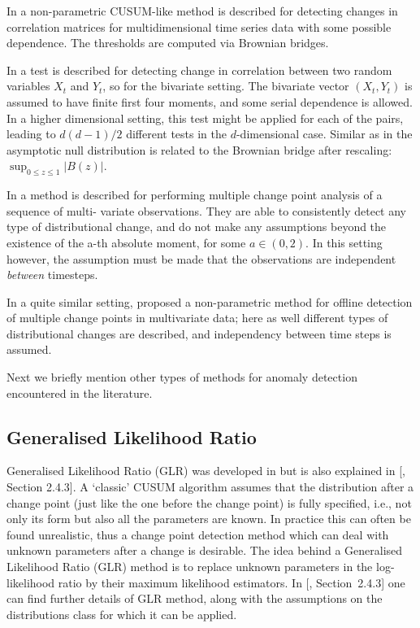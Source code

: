 \documentclass[conference,letterpaper]{IEEEtran}
\begin{document}
In \cite{WIED2012} a non-parametric CUSUM-like method is described for detecting changes in correlation matrices for multidimensional time series data with 
some possible dependence. The thresholds are computed via Brownian bridges.


In \cite{ARNOLD} a test is described for detecting change in correlation between two random variables $X_t$ and $Y_t$, so for the bivariate setting. The 
bivariate vector $(X_t, Y_t)$ is assumed to have finite first four moments, and some serial dependence is allowed. In a higher dimensional setting, this test 
might be applied for each of the pairs, leading to $d(d-1)/2$ different tests in the $d$-dimensional case. Similar as in \cite{AUE} the asymptotic null 
distribution is related to the Brownian bridge after rescaling:  $\sup_{0\leq z\leq 1} |B(z)|$.

In \cite{MATTESON} a method is described for performing multiple change point analysis of a sequence of multi-
variate observations. They are able to consistently detect any type of distributional change, and do not make any assumptions beyond the existence of the 
a-th absolute moment, for some $a\in (0,2)$. In this setting however, the assumption must be made that the observations are independent \textit{between} 
timesteps.

In a quite similar setting, \cite{LUNG}  proposed a non-parametric method for offline detection of multiple change points in multivariate data; here as well 
different types of distributional changes are described, and independency between time steps is assumed.

Next we briefly mention other types of methods for anomaly detection encountered in the literature.

\subsection{Generalised Likelihood Ratio}\label{GLR}
Generalised Likelihood Ratio (GLR) was developed in \cite{SIVE} but is also explained in [\cite{BANI}, Section 2.4.3]. A `classic' CUSUM algorithm assumes 
that the distribution after a change point (just like the one before the change point) is fully specified, i.e., not only its form but also all the 
parameters are known. In practice this can often be found unrealistic, thus a change point detection method which can deal with unknown parameters
after a change is desirable. The idea behind a Generalised Likelihood Ratio (GLR) method is to replace unknown parameters in the log-likelihood ratio by 
their maximum likelihood estimators. In [\cite{BANI}, Section~2.4.3] one can find further details of GLR method, along with the assumptions on the 
distributions class for which it can be applied.
\end{document}
